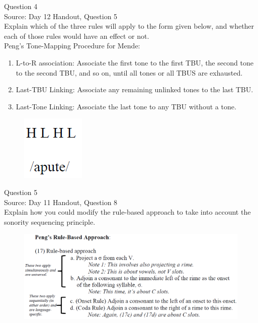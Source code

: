 \documentclass[12pt]{article}
\begin{document}
\newpage

{\large Question 4}\\

Source: Day 12 Handout, Question 5\\

Explain which of the three rules will apply to the form given below, and whether each of those rules would have an effect or not.\\

Peng’s Tone-Mapping Procedure for Mende: \begin{enumerate} \item L-to-R association: Associate the first tone to the first TBU, the second tone to the second TBU, and so on, until all tones or all TBUS are exhausted. \item Last-TBU Linking: Associate any remaining unlinked tones to the last TBU. \item Last-Tone Linking: Associate the last tone to any TBU without a tone. \end{enumerate}

\begin{figure}[H]
\includegraphics{../images/mendetone_d.png}
\end{figure}

\newpage

{\large Question 5}\\

Source: Day 11 Handout, Question 8\\

Explain how you could modify the rule-based approach to take into account the sonority sequencing principle.\\

\begin{figure}[H]
\includegraphics{../images/peng_rules.png}
\end{figure}
\end{document}

